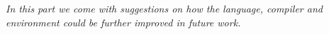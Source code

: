 \textit{In this part we come with suggestions on how the language, compiler and environment could be further improved in future work.}\\ \\